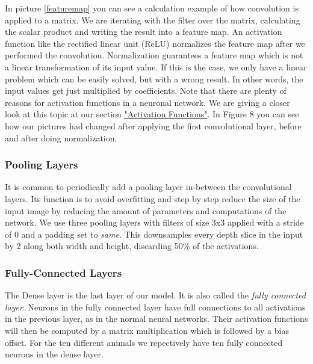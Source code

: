 \documentclass[journal]{IEEEtran}
\begin{document}
In picture \ref{featuremap} you can see a calculation example of how convolution is applied to a matrix. We are iterating with the filter over the matrix, calculating the scalar product and writing the result into a feature map. An activation function like the rectified linear unit (ReLU) normalizes the feature map after we performed the convolution. Normalization guarantees a feature map which is not a linear transformation of its input value. If this is the case, we only have a linear problem which can be easily solved, but with a wrong result. In other words, the input values get just multiplied by coefficients. Note that there are plenty of reasons for activation functions in a neuronal network. We are giving a closer look at this topic at our section \hyperref[sec:activationFunctions]{"Activation Functions"}. In Figure 8 you can see how our pictures had changed after applying the first convolutional layer, before and after doing normalization.  \\
\subsubsection{Pooling Layers}
\noindent It is common to periodically add a pooling layer in-between the convolutional layers. Its function is to avoid overfitting and step by step reduce the size of the input image by reducing the amount of parameters and computations of the network. We use three pooling layers with filters of size 3x3 applied with a stride of 0 and a padding set to \textit{same}. This downsamples every depth slice in the input by 2 along both width and height, discarding 50\% of the activations. \\
\subsubsection{Fully-Connected Layers}
\noindent The Dense layer is the last layer of our model. It is also called the \textit{fully connected layer}. Neurons in the fully connected layer have full connections to all activations in the previous layer, as in the normal neural networks. Their activation functions will then be computed by a matrix multiplication which is followed by a bias offset. 
For the ten different animals we repectively have ten fully connected neurons in the dense layer. \\
\end{document}
